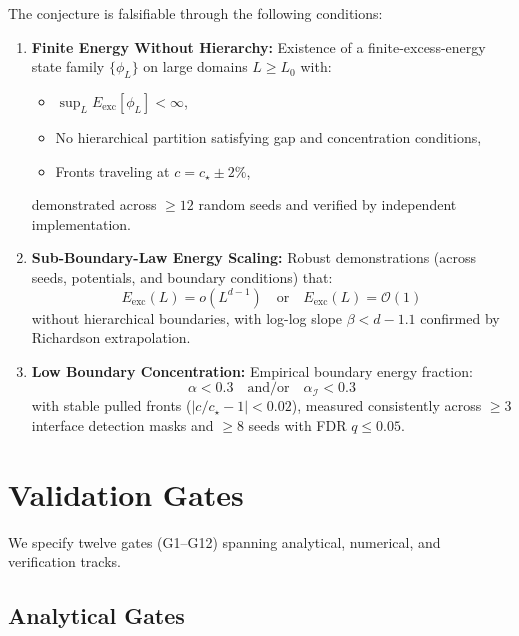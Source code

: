 \documentclass{article}
\begin{document}
The conjecture is falsifiable through the following conditions:

\begin{enumerate}[label=\textbf{F\arabic*.},leftmargin=*]
\item \textbf{Finite Energy Without Hierarchy:} Existence of a finite-excess-energy state family $\{\phi_L\}$ on large domains $L \geq L_0$ with:
\begin{itemize}[noitemsep]
\item $\sup_L E_{\text{exc}}[\phi_L] < \infty$,
\item No hierarchical partition satisfying gap and concentration conditions,
\item Fronts traveling at $c = c_\star \pm 2\%$,
\end{itemize}
demonstrated across $\geq 12$ random seeds and verified by independent implementation.

\item \textbf{Sub-Boundary-Law Energy Scaling:} Robust demonstrations (across seeds, potentials, and boundary conditions) that:
\begin{equation}
E_{\text{exc}}(L) = o(L^{d-1}) \quad \text{or} \quad E_{\text{exc}}(L) = \mathcal{O}(1)
\end{equation}
without hierarchical boundaries, with log-log slope $\beta < d-1.1$ confirmed by Richardson extrapolation.

\item \textbf{Low Boundary Concentration:} Empirical boundary energy fraction:
\begin{equation}
\alpha < 0.3 \quad \text{and/or} \quad \alpha_{\mathcal{I}} < 0.3
\end{equation}
with stable pulled fronts ($|c/c_\star - 1| < 0.02$), measured consistently across $\geq 3$ interface detection masks and $\geq 8$ seeds with FDR $q \leq 0.05$.
\end{enumerate}

\section{Validation Gates}
\label{sec:gates}

We specify twelve gates (G1--G12) spanning analytical, numerical, and verification tracks.

\subsection*{Analytical Gates}
\end{document}

